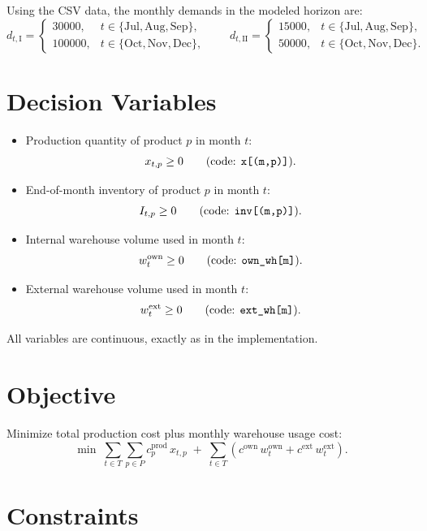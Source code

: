 Using the CSV data, the monthly demands in the modeled horizon are:
\[
d_{t,\mathrm{I}}=
\begin{cases}
30000,& t\in\{\text{Jul},\text{Aug},\text{Sep}\},\\
100000,& t\in\{\text{Oct},\text{Nov},\text{Dec}\},
\end{cases}
\qquad
d_{t,\mathrm{II}}=
\begin{cases}
15000,& t\in\{\text{Jul},\text{Aug},\text{Sep}\},\\
50000,& t\in\{\text{Oct},\text{Nov},\text{Dec}\}.
\end{cases}
\]

\section*{Decision Variables}

\begin{itemize}
    \item Production quantity of product $p$ in month $t$:
    \[
    x_{t,p} \ge 0
    \qquad\text{(code: \texttt{x[(m,p)]})}.
    \]
    \item End-of-month inventory of product $p$ in month $t$:
    \[
    I_{t,p} \ge 0
    \qquad\text{(code: \texttt{inv[(m,p)]})}.
    \]
    \item Internal warehouse volume used in month $t$:
    \[
    w^{\mathrm{own}}_t \ge 0
    \qquad\text{(code: \texttt{own\_wh[m]})}.
    \]
    \item External warehouse volume used in month $t$:
    \[
    w^{\mathrm{ext}}_t \ge 0
    \qquad\text{(code: \texttt{ext\_wh[m]})}.
    \]
\end{itemize}

All variables are continuous, exactly as in the implementation.

\section*{Objective}

Minimize total production cost plus monthly warehouse usage cost:
\[
\min \;
\sum_{t\in T}\sum_{p\in P} c^{\mathrm{prod}}_p\, x_{t,p}
\;+\;
\sum_{t\in T}\left(
c^{\mathrm{own}}\, w^{\mathrm{own}}_t
+
c^{\mathrm{ext}}\, w^{\mathrm{ext}}_t
\right).
\]

\section*{Constraints}

